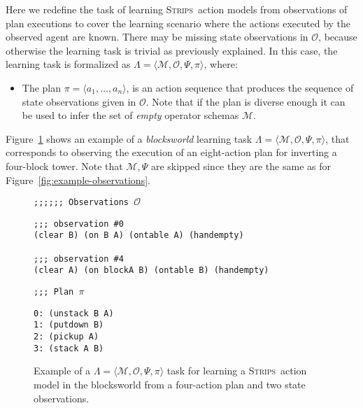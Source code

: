 \documentclass[3p,times]{elsarticle}
\newcommand{\strips}{\textsc{Strips}}     %
\newcommand{\tup}[1]{{\langle #1 \rangle}}
\begin{document}
Here we redefine the task of learning \strips\ action models from observations of plan executions to cover the learning scenario where the actions executed by the observed agent are known. There may be missing state observations in $\mathcal{O}$, because otherwise the learning task is trivial as previously explained. In this case, the learning task is formalized as $\Lambda=\tup{\mathcal{M},\mathcal{O},\Psi,\pi}$, where:
\begin{itemize}
\item The plan $\pi=\tup{a_1, \ldots, a_n}$, is an action sequence that produces the sequence of state observations given in $\mathcal{O}$. Note that if the plan is diverse enough it can be used to infer the set of {\em empty} operator schemas $\mathcal{M}$.
\end{itemize}

Figure~\ref{fig:example-plans} shows an example of a {\em blocksworld} learning task $\Lambda=\tup{\mathcal{M},\mathcal{O},\Psi,\pi}$, that corresponds to observing the execution of an eight-action plan for inverting a four-block tower. Note that $\mathcal{M},\Psi$ are skipped since they are the same as for Figure~\ref{fig:example-observations}.

\begin{figure}[hbt!]
{\footnotesize\tt ;;;;;; Observations $\mathcal{O}$}
\begin{footnotesize}
\begin{verbatim}
;;; observation #0
(clear B) (on B A) (ontable A) (handempty)

;;; observation #4
(clear A) (on blockA B) (ontable B) (handempty)
\end{verbatim}
\end{footnotesize}
  
{\footnotesize\tt ;;; Plan $\pi$}
\begin{footnotesize}
\begin{verbatim}
0: (unstack B A)
1: (putdown B)
2: (pickup A)
3: (stack A B)
\end{verbatim}
\end{footnotesize}

 \caption{\small Example of a $\Lambda=\tup{\mathcal{M},\mathcal{O},\Psi,\pi}$ task for learning a \strips\ action model in the blocksworld from a four-action plan and two state observations.}
\label{fig:example-plans}
\end{figure}
\end{document}
